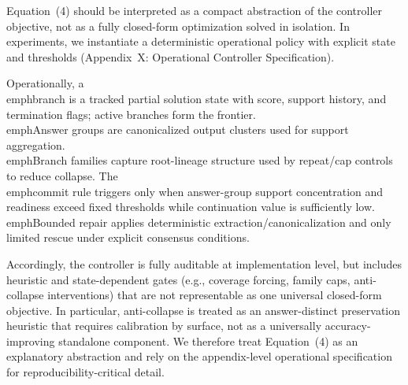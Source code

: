 Equation~(4) should be interpreted as a compact abstraction of the controller objective, not as a fully closed-form optimization solved in isolation. In experiments, we instantiate a deterministic operational policy with explicit state and thresholds (Appendix~X: Operational Controller Specification).

Operationally, a \\emph{branch} is a tracked partial solution state with score, support history, and termination flags; active branches form the frontier. \\emph{Answer groups} are canonicalized output clusters used for support aggregation. \\emph{Branch families} capture root-lineage structure used by repeat/cap controls to reduce collapse. The \\emph{commit rule} triggers only when answer-group support concentration and readiness exceed fixed thresholds while continuation value is sufficiently low. \\emph{Bounded repair} applies deterministic extraction/canonicalization and only limited rescue under explicit consensus conditions.

Accordingly, the controller is fully auditable at implementation level, but includes heuristic and state-dependent gates (e.g., coverage forcing, family caps, anti-collapse interventions) that are not representable as one universal closed-form objective. In particular, anti-collapse is treated as an answer-distinct preservation heuristic that requires calibration by surface, not as a universally accuracy-improving standalone component. We therefore treat Equation~(4) as an explanatory abstraction and rely on the appendix-level operational specification for reproducibility-critical detail.
